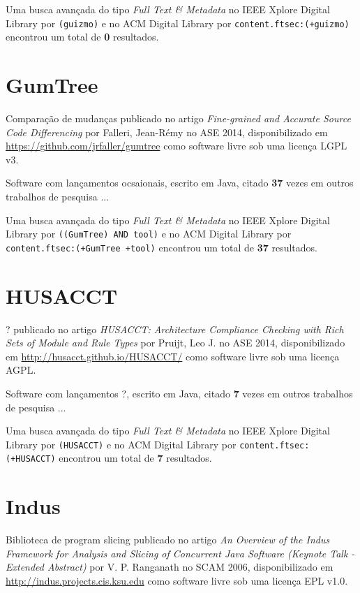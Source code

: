 Uma busca avançada do tipo {\it Full Text \& Metadata} no IEEE Xplore Digital Library por
\texttt{(guizmo)}
e no ACM Digital Library por
\texttt{content.ftsec:(+guizmo)}
encontrou um total de
{\bf 0}
resultados.

\section{GumTree}

Comparação de mudanças
publicado no artigo {\it Fine-grained and Accurate Source Code Differencing}
por Falleri, Jean-R{\'e}my
no ASE 2014,
disponibilizado em \url{https://github.com/jrfaller/gumtree}
como software livre
sob uma licença LGPL v3.

Software com lançamentos ocsaionais,
escrito em Java,
citado {\bf 37} vezes em outros trabalhos de pesquisa ...

Uma busca avançada do tipo {\it Full Text \& Metadata} no IEEE Xplore Digital Library por
\texttt{((GumTree) AND tool)}
e no ACM Digital Library por
\texttt{content.ftsec:(+GumTree +tool)}
encontrou um total de
{\bf 37}
resultados.

\section{HUSACCT}

?
publicado no artigo {\it HUSACCT: Architecture Compliance Checking with Rich Sets of Module and Rule Types}
por Pruijt, Leo J.
no ASE 2014,
disponibilizado em \url{http://husacct.github.io/HUSACCT/}
como software livre
sob uma licença AGPL.

Software com lançamentos ?,
escrito em Java,
citado {\bf 7} vezes em outros trabalhos de pesquisa ...

Uma busca avançada do tipo {\it Full Text \& Metadata} no IEEE Xplore Digital Library por
\texttt{(HUSACCT)}
e no ACM Digital Library por
\texttt{content.ftsec:(+HUSACCT)}
encontrou um total de
{\bf 7}
resultados.

\section{Indus}

Biblioteca de program slicing
publicado no artigo {\it An Overview of the Indus Framework for Analysis and Slicing of Concurrent Java Software (Keynote Talk - Extended Abstract)}
por V. P. Ranganath
no SCAM 2006,
disponibilizado em \url{http://indus.projects.cis.ksu.edu}
como software livre
sob uma licença EPL v1.0.

